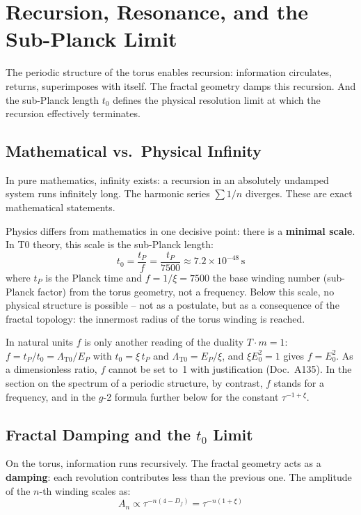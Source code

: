 	
	\section{Recursion, Resonance, and the Sub-Planck Limit}
	
	The periodic structure of the torus enables recursion: information circulates, returns, superimposes with itself. The fractal geometry damps this recursion. And the sub-Planck length $t_0$ defines the physical resolution limit at which the recursion effectively terminates.
	
	\subsection{Mathematical vs.\ Physical Infinity}
	
	In pure mathematics, infinity exists: a recursion in an absolutely undamped system runs infinitely long. The harmonic series $\sum 1/n$ diverges. These are exact mathematical statements.
	
	Physics differs from mathematics in one decisive point: there is a \textbf{minimal scale}. In T0 theory, this scale is the sub-Planck length:
	\begin{equation}
		t_0 = \frac{t_P}{f} = \frac{t_P}{7500} \approx 7.2 \times 10^{-48} \, \text{s}
	\end{equation}
	where $t_P$ is the Planck time and $f = 1/\xi = 7500$ the base winding number (sub-Planck factor) from the torus geometry, not a frequency. Below this scale, no physical structure is possible -- not as a postulate, but as a consequence of the fractal topology: the innermost radius of the torus winding is reached.

In natural units $f$ is only another reading of the duality $T\cdot m = 1$: $f = t_P/t_0 = \Lambda_{\text{T0}}/E_P$ with $t_0 = \xi\,t_P$ and $\Lambda_{\text{T0}} = E_P/\xi$, and $\xi E_0^2 = 1$ gives $f = E_0^2$. As a dimensionless ratio, $f$ cannot be set to~1 with justification (Doc.~A135). In the section on the spectrum of a periodic structure, by contrast, $f$ stands for a frequency, and in the $g$-2 formula further below for the constant $\tau^{-1+\xi}$.

	\subsection{Fractal Damping and the $t_0$ Limit}
	
	On the torus, information runs recursively. The fractal geometry acts as a \textbf{damping}: each revolution contributes less than the previous one. The amplitude of the $n$-th winding scales as:
	\begin{equation}
		A_n \propto \tau^{-n(4-D_f)} = \tau^{-n(1+\xi)}
	\end{equation}
	
